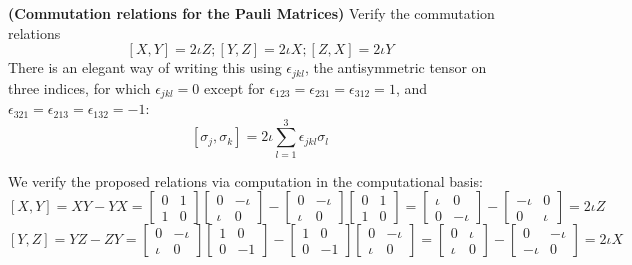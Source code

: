 \begin{example}
    \textbf{(Commutation relations for the Pauli Matrices)} Verify the commutation relations
    \[
    [X,Y]=2\iota Z;[Y,Z]=2\iota X;[Z,X]=2\iota Y
    \]
    There is an elegant way of writing this using $\epsilon_{jkl}$, the antisymmetric tensor on three indices, for which $\epsilon_{jkl}=0$ except for $\epsilon_{123}=\epsilon_{231}=\epsilon_{312}=1$, and $\epsilon_{321}=\epsilon_{213}=\epsilon_{132}=-1$:
    \[
    [\sigma_j,\sigma_k]=2\iota\sum_{l=1}^3 \epsilon_{jkl}\sigma_l
    \]

    We verify the proposed relations via computation in the computational basis:
    \[
    [X,Y]=XY-YX=\begin{bmatrix} 0 & 1 \\ 1 & 0 \end{bmatrix}\begin{bmatrix} 0 & -\iota \\ \iota & 0 \end{bmatrix} - \begin{bmatrix}0 & -\iota \\ \iota & 0 \end{bmatrix} \begin{bmatrix} 0 & 1 \\ 1 & 0 \end{bmatrix} = \begin{bmatrix} \iota & 0 \\ 0 & -\iota \end{bmatrix} - \begin{bmatrix} -\iota & 0 \\ 0 & \iota \end{bmatrix} =2\iota Z
    \]
    \[
    [Y,Z]=YZ-ZY=\begin{bmatrix} 0 & -\iota  \\ \iota & 0 \end{bmatrix}\begin{bmatrix} 1 & 0 \\ 0 & -1 \end{bmatrix} - \begin{bmatrix} 1 & 0 \\ 0 & -1 \end{bmatrix} \begin{bmatrix} 0 & -\iota  \\ \iota & 0 \end{bmatrix} = \begin{bmatrix} 0 & \iota \\ \iota & 0 \end{bmatrix} - \begin{bmatrix} 0 & -\iota \\ -\iota & 0 \end{bmatrix} =2\iota X
\]
\end{example}

